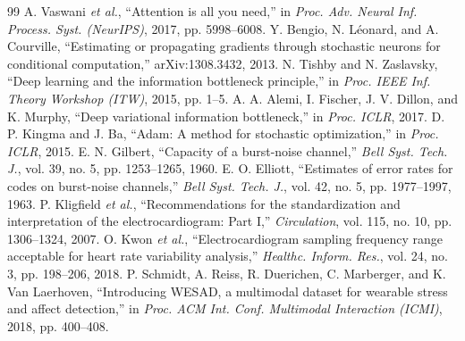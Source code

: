 \documentclass[journal]{IEEEtran}
\begin{document}
\begin{thebibliography}{99}
 A. Vaswani \emph{et al.}, ``Attention is all you need,'' in \emph{Proc. Adv. Neural Inf. Process. Syst. (NeurIPS)}, 2017, pp. 5998--6008.
 Y. Bengio, N. L\'eonard, and A. Courville, ``Estimating or propagating gradients through stochastic neurons for conditional computation,'' arXiv:1308.3432, 2013.
 N. Tishby and N. Zaslavsky, ``Deep learning and the information bottleneck principle,'' in \emph{Proc. IEEE Inf. Theory Workshop (ITW)}, 2015, pp. 1--5.
 A. A. Alemi, I. Fischer, J. V. Dillon, and K. Murphy, ``Deep variational information bottleneck,'' in \emph{Proc. ICLR}, 2017.
 D. P. Kingma and J. Ba, ``Adam: A method for stochastic optimization,'' in \emph{Proc. ICLR}, 2015.
 E. N. Gilbert, ``Capacity of a burst-noise channel,'' \emph{Bell Syst. Tech. J.}, vol. 39, no. 5, pp. 1253--1265, 1960.
 E. O. Elliott, ``Estimates of error rates for codes on burst-noise channels,'' \emph{Bell Syst. Tech. J.}, vol. 42, no. 5, pp. 1977--1997, 1963.
 P. Kligfield \emph{et al.}, ``Recommendations for the standardization and interpretation of the electrocardiogram: Part I,'' \emph{Circulation}, vol. 115, no. 10, pp. 1306--1324, 2007.
 O. Kwon \emph{et al.}, ``Electrocardiogram sampling frequency range acceptable for heart rate variability analysis,'' \emph{Healthc. Inform. Res.}, vol. 24, no. 3, pp. 198--206, 2018.
 P. Schmidt, A. Reiss, R. Duerichen, C. Marberger, and K. Van Laerhoven, ``Introducing WESAD, a multimodal dataset for wearable stress and affect detection,'' in \emph{Proc. ACM Int. Conf. Multimodal Interaction (ICMI)}, 2018, pp. 400--408.
\end{thebibliography}
\end{document}
